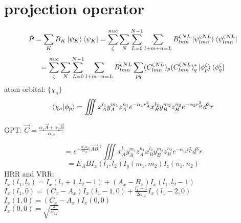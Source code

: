 \documentclass{article}
\begin{document}
\newpage
\section{projection operator}
	\begin{displaymath}
		\hat{P}=\sum_K B_K \ket{\psi_K} \bra{\psi_K}
		=\sum_{\zeta}^{nuc} \sum_N \sum_{L=0}^{N-1} \sum_{l+m+n=L} 
		B^{\zeta NL}_{lmn} \ket{\psi^{\zeta NL}_{lmn}} \bra{\psi^{\zeta NL}_{lmn}}
	\end{displaymath}
	\begin{displaymath}
		=\sum_{\zeta}^{nuc} \sum_N \sum_{L=0}^{N-1} \sum_{l+m+n=L} B^{\zeta NL}_{lmn}
		\sum_{pq} (C^{\zeta NL}_{lmn})_p (C^{\zeta NL}_{lmn})^*_q \ket{\phi_p^{\zeta}} \bra{\phi_q^{\zeta}}
	\end{displaymath}
	atom orbital: $\{\chi_a\}$
	\begin{displaymath}
		\braket{\chi_a|\phi_p}=\iiint x^{l_1}_A y^{m_1}_A z^{n_1}_A e^{-\alpha_1r_A^2}
		x_B^{l_2} y_B^{m_2} z_B^{n_2} e^{-\alpha_2r_B^2} d^3r
	\end{displaymath}
	\begin{center}
		GPT: $\vec{C}=\frac{\alpha_1\vec{A}+\alpha_2\vec{B}}{\alpha_{12}}$
	\end{center}
	\begin{displaymath}
		=e^{-\frac{\alpha_1\alpha_2}{\alpha_{12}} \vert \overrightarrow{AB} \vert^2}
		\iiint x^{l_1}_A y^{m_1}_A z^{n_1}_A x_B^{l_2} y_B^{m_2} z_B^{n_2} e^{-\alpha_{12}r_C^2} d^3r
	\end{displaymath}
	\begin{displaymath}
		=E_AB I_x(l_1,l_2) I_y(m_1,m_2) I_z(n_1,n_2)
	\end{displaymath}
	HRR and VRR:\\
		$	I_x(l_1,l_2)=I_x(l_1+1,l_2-1)+(A_x-B_x)I_x(l_1,l_2-1)	$\\
		$	I_x(l_1,0)=(C_x-A_x)I_x(l_1-1,0)+\frac{l_1-1}{2\alpha_{12}}I_x(l_1-2,0)	$\\
		$	I_x(1,0)=(C_x-A_x)I_x(0,0)	$\\
		$	I_x(0,0)=\sqrt{\frac{\pi}{\alpha_{12}}}	$
		
\newpage 
\end{document}
